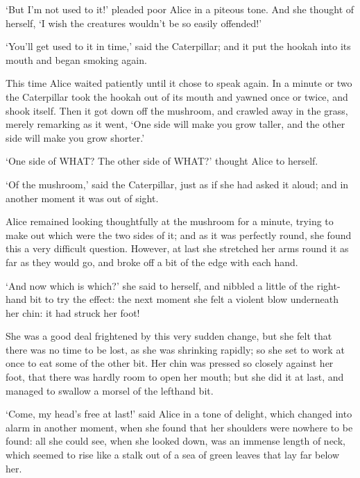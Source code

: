 \documentclass[12pt]{article}
\begin{document}
\begin{Parallel}[p]{}{}
{‘But I’m not used to it!’ pleaded poor Alice in a piteous tone. And she thought of herself, ‘I wish the creatures wouldn’t be so easily offended!’

‘You’ll get used to it in time,’ said the Caterpillar; and it put the hookah into its mouth and began smoking again.

This time Alice waited patiently until it chose to speak again. In a minute or two the Caterpillar took the hookah out of its mouth and yawned once or twice, and shook itself. Then it got down off the mushroom, and crawled away in the grass, merely remarking as it went, ‘One side will make you grow taller, and the other side will make you grow shorter.’

‘One side of WHAT? The other side of WHAT?’ thought Alice to herself.

‘Of the mushroom,’ said the Caterpillar, just as if she had asked it aloud; and in another moment it was out of sight.

Alice remained looking thoughtfully at the mushroom for a minute, trying to make out which were the two sides of it; and as it was perfectly round, she found this a very difficult question. However, at last she stretched her arms round it as far as they would go, and broke off a bit of the edge with each hand.

‘And now which is which?’ she said to herself, and nibbled a little of the right-hand bit to try the effect: the next moment she felt a violent blow underneath her chin: it had struck her foot!

She was a good deal frightened by this very sudden change, but she felt that there was no time to be lost, as she was shrinking rapidly; so she set to work at once to eat some of the other bit. Her chin was pressed so closely against her foot, that there was hardly room to open her mouth; but she did it at last, and managed to swallow a morsel of the lefthand bit.


\begin{center}
\quad*\quad*\quad*\quad*\quad*\quad*\quad*
\par
\quad*\quad*\quad*\quad*\quad*\quad*
\par
\quad*\quad*\quad*\quad*\quad*\quad*\quad*
\end{center}

‘Come, my head’s free at last!’ said Alice in a tone of delight, which changed into alarm in another moment, when she found that her shoulders were nowhere to be found: all she could see, when she looked down, was an immense length of neck, which seemed to rise like a stalk out of a sea of green leaves that lay far below her.

}
\end{Parallel}
\end{document}
